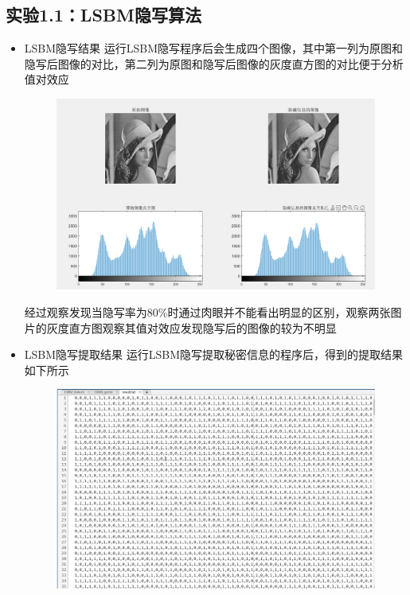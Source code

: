\documentclass[a4paper,11pt,UTF8]{ctexart}
\newcommand{\bottomcaption}{%
\setlength{\abovecaptionskip}{6pt}%
\setlength{\belowcaptionskip}{6pt}%
\caption}
\newcommand{\xiaowuhao}{\fontsize{9pt}{\baselineskip}\selectfont}   %
\begin{document}
  \subsection{实验1.1：LSBM隐写算法}
    \begin{itemize}
      \item LSBM隐写结果
        运行LSBM隐写程序后会生成四个图像，其中第一列为原图和隐写后图像的对比，第二列为原图和隐写后图像的灰度直方图的对比便于分析值对效应
        \begin{figure}[H]
          \centering
          \includegraphics[width=\textwidth]{LSBM_hide.png}
          \bottomcaption{\xiaowuhao{LSBM隐写前后图像}}
        \end{figure}
        经过观察发现当隐写率为80\%时通过肉眼并不能看出明显的区别，观察两张图片的灰度直方图观察其值对效应发现隐写后的图像的较为不明显
\newpage
      \item LSBM隐写提取结果
        运行LSBM隐写提取秘密信息的程序后，得到的提取结果如下所示
        \begin{figure}[H]
          \centering
          \includegraphics[width=13cm]{LSBM_get.png}
          \bottomcaption{\xiaowuhao{LSBM隐写提取结果}}
        \end{figure}


\end{itemize}
\end{document}
